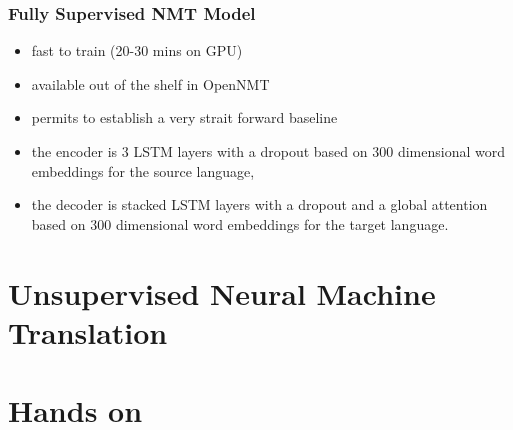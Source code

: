 \documentclass{beamer}
\begin{document}
\begin{frame}
\frametitle{Fully Supervised NMT Model}

\begin{itemize}
\item fast to train (20-30 mins on GPU)
\item available out of the shelf in OpenNMT
\item permits to establish a very strait forward baseline
\item<2-3> the encoder is $3$ LSTM layers with a dropout based on $300$ dimensional word embeddings for the source language,
\item<2-3> the decoder is stacked LSTM layers with a dropout and a global attention based on $300$ dimensional word embeddings for the target language.
\end{itemize}


\end{frame}

\section{Unsupervised Neural Machine Translation}

\section{Hands on}

\end{document}
